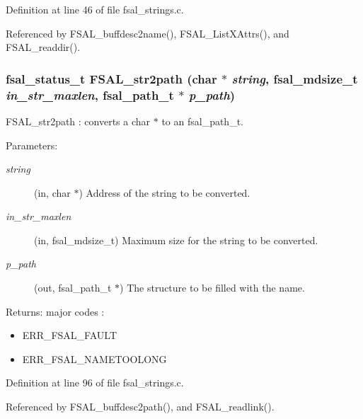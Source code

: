Definition at line 46 of file fsal\_\-strings.c.

Referenced by FSAL\_\-buffdesc2name(), FSAL\_\-ListXAttrs(), and FSAL\_\-readdir().
\subsubsection[{FSAL\_\-str2path}]{\setlength{\rightskip}{0pt plus 5cm}fsal\_\-status\_\-t FSAL\_\-str2path (char $\ast$ {\em string}, \/  fsal\_\-mdsize\_\-t {\em in\_\-str\_\-maxlen}, \/  fsal\_\-path\_\-t $\ast$ {\em p\_\-path})}\label{group__FSALNameFunctions_g77a250fef8b55ed3e672e9f136f705b6}


FSAL\_\-str2path : converts a char $\ast$ to an fsal\_\-path\_\-t.

\begin{Desc}
\item[Parameters:]
\begin{description}
\item[{\em string}](in, char $\ast$) Address of the string to be converted. \item[{\em in\_\-str\_\-maxlen}](in, fsal\_\-mdsize\_\-t) Maximum size for the string to be converted. \item[{\em p\_\-path}](out, fsal\_\-path\_\-t $\ast$) The structure to be filled with the name.\end{description}
\end{Desc}
\begin{Desc}
\item[Returns:]major codes :\begin{itemize}
\item ERR\_\-FSAL\_\-FAULT\item ERR\_\-FSAL\_\-NAMETOOLONG \end{itemize}
\end{Desc}


Definition at line 96 of file fsal\_\-strings.c.

Referenced by FSAL\_\-buffdesc2path(), and FSAL\_\-readlink().